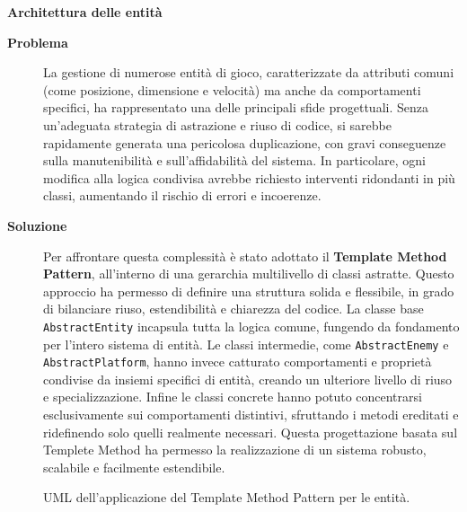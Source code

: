 \documentclass[a4paper,12pt]{report}
\begin{document}
\newpage
\noindent
\textbf{Architettura delle entità}
\begin{description}
	\item[\textbf{Problema}]
	      La gestione di numerose entità di gioco, caratterizzate da attributi comuni (come posizione, dimensione e velocità) ma anche da comportamenti specifici, ha rappresentato una delle
	      principali sfide progettuali. Senza un'adeguata strategia di astrazione e riuso di codice, si sarebbe rapidamente generata una pericolosa duplicazione, con gravi conseguenze sulla manutenibilità
	      e sull'affidabilità del sistema. In particolare, ogni modifica alla logica condivisa avrebbe richiesto interventi ridondanti in più classi, aumentando il rischio di errori e incoerenze.

	\item[\textbf{Soluzione}]
	      Per affrontare questa complessità è stato adottato il \textbf{Template Method Pattern}, all'interno di una gerarchia multilivello di classi astratte. Questo approccio ha permesso di definire una struttura
	      solida e flessibile, in grado di bilanciare riuso, estendibilità e chiarezza del codice.
	      La classe base \texttt{AbstractEntity} incapsula tutta la logica comune, fungendo da fondamento per l'intero sistema di entità. Le classi intermedie, come \texttt{AbstractEnemy} e \texttt{AbstractPlatform},
	      hanno invece catturato comportamenti e proprietà condivise da insiemi specifici di entità, creando un ulteriore livello di riuso e specializzazione.
	      Infine le classi concrete hanno potuto concentrarsi esclusivamente sui comportamenti distintivi, sfruttando i metodi ereditati e ridefinendo solo quelli realmente necessari.
	      Questa progettazione basata sul Templete Method ha permesso la realizzazione di un sistema robusto, scalabile e facilmente estendibile.
\end{description}
\begin{figure}[H]
	\centering{}
	
	\caption{UML dell'applicazione del Template Method Pattern per le entità.}
	\label{img:AbstractEntity}
\end{figure}
\end{document}

